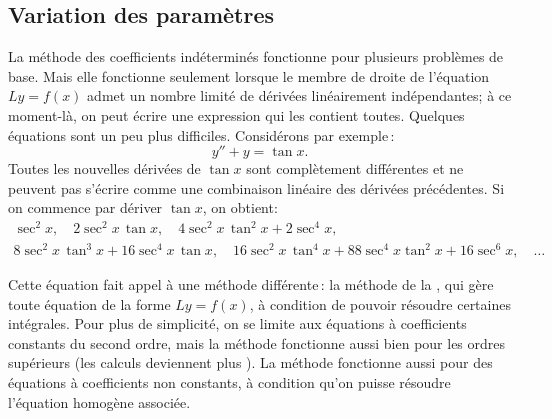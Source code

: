 \subsection{Variation des paramètres}

La méthode des coefficients indéterminés fonctionne pour plusieurs problèmes de base. Mais elle fonctionne seulement lorsque le membre de droite de l'équation  $Ly = f(x)$ 
admet un nombre limité de dérivées linéairement indépendantes; à ce moment-là, on peut écrire une expression qui les contient toutes. Quelques équations sont un peu plus difficiles. Considérons par exemple\,: 
\begin{equation*}
y''+y = \tan x .
\end{equation*}
Toutes les nouvelles dérivées de $\tan x$ sont complètement différentes et ne peuvent pas s'écrire comme une combinaison linéaire des dérivées précédentes. Si on commence par dériver  $\tan x$, on obtient:
\begin{multline*}
\sec^2 x, \quad
2\sec^2 x \, \tan x, \quad
4 \sec^2 x \, \tan^2 x + 2 \sec^4 x, \\
8 \sec^2 x \, \tan^3 x + 16 \sec^4 x \, \tan x, \quad
16\sec^2 x \, \tan^4 x + 88 \sec^4 x \tan^2 x + 16 \sec^6 x, \quad
\ldots
\end{multline*}

Cette équation fait appel à une méthode différente\,: la méthode de la
\emph{}, qui gère toute équation de
la forme $Ly = f(x)$, à condition de pouvoir résoudre certaines intégrales.  Pour plus de simplicité, on se limite
 aux équations à coefficients constants du second ordre,
mais la méthode fonctionne aussi bien pour les ordres supérieurs (les calculs deviennent plus
). %
La méthode fonctionne aussi pour des équations à coefficients non constants, à condition qu'on puisse résoudre l'équation homogène associée.  

